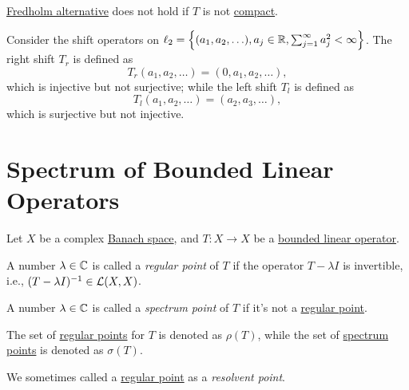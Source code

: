 \hyperref[thm:Fredholm-alternative]{Fredholm alternative} does not hold if \(T\) is not \hyperref[def:compact-op]{compact}.
\begin{eg}
	Consider the shift operators on \(\ell _2 = \left\{ (a_1, a_2, \ldots ), a_j\in \mathbb{\MakeUppercase{r}}, \sum_{j=1}^{\infty}  a_j^2 < \infty \right\} \). The right shift \(T_r\) is defined as
	\[
		T_r(a_1, a_2, \ldots) = (0, a_1, a_2, \ldots ),
	\]
	which is injective but not surjective; while the left shift \(T_l\) is defined as
	\[
		T_l(a_1, a_2, \ldots ) = (a_2, a_3, \ldots ),
	\]
	which is surjective but not injective.
\end{eg}

\section{Spectrum of Bounded Linear Operators}

\begin{definition*}
	Let \(X\) be a complex \hyperref[def:Banach-space]{Banach space}, and \(T\colon X \to X\) be a \hyperref[def:bounded-linear-op]{bounded linear operator}.
	\begin{definition}\label{def:regular-point}
		A number \(\lambda \in \mathbb{\MakeUppercase{c}} \) is called a \emph{regular point} of \(T\) if the operator \(T-\lambda I\) is invertible, i.e., \((T-\lambda I)^{-1} \in \mathcal{\MakeUppercase{l}} (X, X)\).
	\end{definition}
	\begin{definition}\label{def:spectrum-point}
		A number \(\lambda \in \mathbb{\MakeUppercase{c}} \) is called a \emph{spectrum point} of \(T\) if it's not a \hyperref[def:regular-point]{regular point}.
	\end{definition}
\end{definition*}

\begin{notation}
	The set of \hyperref[def:regular-point]{regular points} for \(T\) is denoted as \(\rho (T)\), while the set of \hyperref[def:spectrum-point]{spectrum points} is denoted as \(\sigma (T)\).
\end{notation}

\begin{remark}
	We sometimes called a \hyperref[def:regular-point]{regular point} as a \emph{resolvent point}.
\end{remark}

